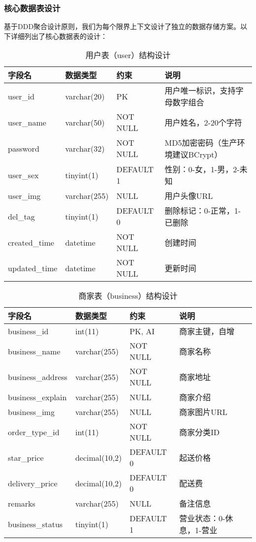 \documentclass[a4paper,12pt]{article}
\begin{document}
\subsubsection{核心数据表设计}

基于DDD聚合设计原则，我们为每个限界上下文设计了独立的数据存储方案。以下详细列出了核心数据表的设计：

\begin{table}[H]
\centering
\caption{用户表（user）结构设计}
\begin{tabular}{|p{3cm}|p{2cm}|p{1.5cm}|p{6cm}|}
\hline
\textbf{字段名} & \textbf{数据类型} & \textbf{约束} & \textbf{说明} \\
\hline
user\_id & varchar(20) & PK & 用户唯一标识，支持字母数字组合 \\
\hline
user\_name & varchar(50) & NOT NULL & 用户姓名，2-20个字符 \\
\hline
password & varchar(32) & NOT NULL & MD5加密密码（生产环境建议BCrypt） \\
\hline
user\_sex & tinyint(1) & DEFAULT 1 & 性别：0-女，1-男，2-未知 \\
\hline
user\_img & varchar(255) & NULL & 用户头像URL \\
\hline
del\_tag & tinyint(1) & DEFAULT 0 & 删除标记：0-正常，1-已删除 \\
\hline
created\_time & datetime & NOT NULL & 创建时间 \\
\hline
updated\_time & datetime & NOT NULL & 更新时间 \\
\hline
\end{tabular}
\end{table}

\begin{table}[H]
\centering
\caption{商家表（business）结构设计}
\begin{tabular}{|p{3cm}|p{2cm}|p{1.5cm}|p{6cm}|}
\hline
\textbf{字段名} & \textbf{数据类型} & \textbf{约束} & \textbf{说明} \\
\hline
business\_id & int(11) & PK, AI & 商家主键，自增 \\
\hline
business\_name & varchar(255) & NOT NULL & 商家名称 \\
\hline
business\_address & varchar(255) & NOT NULL & 商家地址 \\
\hline
business\_explain & varchar(255) & NULL & 商家介绍 \\
\hline
business\_img & varchar(255) & NULL & 商家图片URL \\
\hline
order\_type\_id & int(11) & NOT NULL & 商家分类ID \\
\hline
star\_price & decimal(10,2) & DEFAULT 0 & 起送价格 \\
\hline
delivery\_price & decimal(10,2) & DEFAULT 0 & 配送费 \\
\hline
remarks & varchar(255) & NULL & 备注信息 \\
\hline
business\_status & tinyint(1) & DEFAULT 1 & 营业状态：0-休息，1-营业 \\
\hline
\end{tabular}
\end{table}
\end{document}
